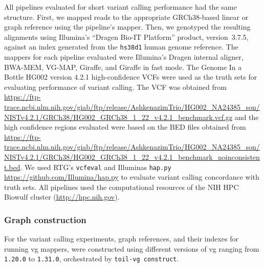 \documentclass[11pt]{ucscthesis}
\begin{document}
All pipelines evaluated for short variant calling performance had the same structure.
First, we mapped reads to the appropriate GRCh38-based linear or graph reference using the pipeline's mapper.
Then, we genotyped the resulting alignments using Illumina’s ``Dragen Bio-IT Platform'' product, version~3.7.5, against an index generated from the \texttt{hs38d1} human genome reference.
The mappers for each pipeline evaluated were Illumina’s Dragen internal aligner, BWA-MEM, VG-MAP, Giraffe, and Giraffe in fast mode.
The Genome In a Bottle HG002 version 4.2.1 high-confidence VCFs were used as the truth sets for evaluating performance of variant calling\cite{chin2020diploid}.
The VCF was obtained from \url{https://ftp-trace.ncbi.nlm.nih.gov/giab/ftp/release/AshkenazimTrio/HG002_NA24385_son/NISTv4.2.1/GRCh38/HG002_GRCh38_1_22_v4.2.1_benchmark.vcf.gz} and the high confidence regions evaluated were based on the BED files obtained from \url{https://ftp-trace.ncbi.nlm.nih.gov/giab/ftp/release/AshkenazimTrio/HG002_NA24385_son/NISTv4.2.1/GRCh38/HG002_GRCh38_1_22_v4.2.1_benchmark_noinconsistent.bed}.
We used RTG's \texttt{vcfeval} \cite{cleary2015comparing} and Illuminas \texttt{hap.py} \url{https://github.com/Illumina/hap.py} to evaluate variant calling concordance with truth sets.
All pipelines used the computational resources of the NIH HPC Biowulf cluster (\url{http://hpc.nih.gov}).


\subsubsection{Graph construction} \label{subsec:aim2:graph_construction}
For the variant calling experiments, graph references, and their indexes for running vg mappers, were constructed using different versions of vg ranging from \texttt{1.20.0} to \texttt{1.31.0}, orchestrated by \texttt{toil-vg~construct}.
\end{document}

